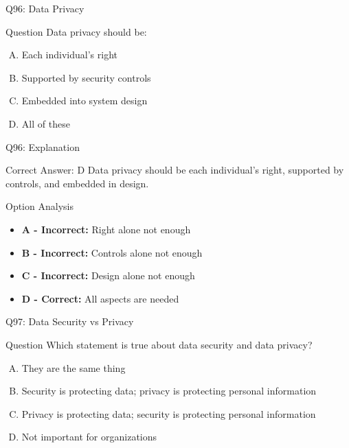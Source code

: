\documentclass{beamer}
\begin{document}
	\begin{frame}{Q96: Data Privacy}
		\begin{block}{Question}
			Data privacy should be:
		\end{block}
		\begin{enumerate}[(A)]
			\item Each individual's right
			\item Supported by security controls
			\item Embedded into system design
			\item All of these
		\end{enumerate}
	\end{frame}
	
	\begin{frame}{Q96: Explanation}
		\begin{block}{Correct Answer: D}
			Data privacy should be each individual's right, supported by controls, and embedded in design.
		\end{block}
		\begin{block}{Option Analysis}
			\begin{itemize}
				\item \textbf{A - Incorrect:} Right alone not enough
				\item \textbf{B - Incorrect:} Controls alone not enough
				\item \textbf{C - Incorrect:} Design alone not enough
				\item \textbf{D - Correct:} All aspects are needed
			\end{itemize}
		\end{block}
	\end{frame}
	
	\begin{frame}{Q97: Data Security vs Privacy}
		\begin{block}{Question}
			Which statement is true about data security and data privacy?
		\end{block}
		\begin{enumerate}[(A)]
			\item They are the same thing
			\item Security is protecting data; privacy is protecting personal information
			\item Privacy is protecting data; security is protecting personal information
			\item Not important for organizations
		\end{enumerate}
	\end{frame}
	
\end{document}
